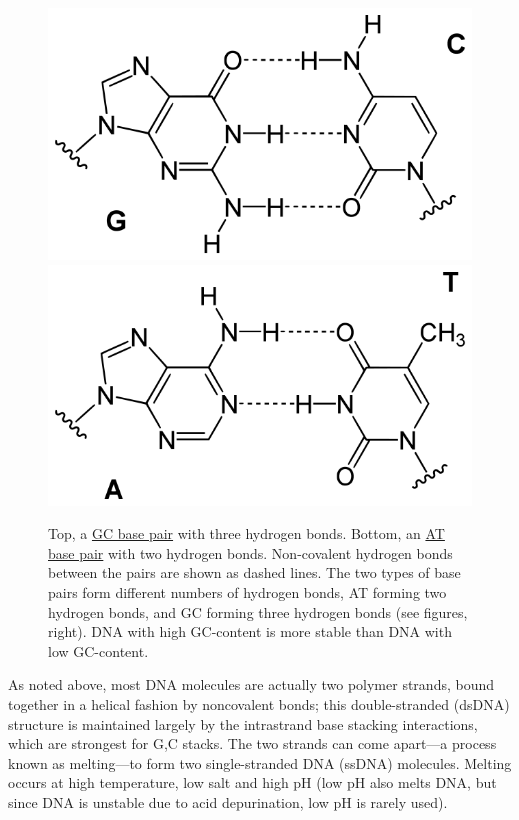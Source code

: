 \begin{figure}

{\centering \includegraphics[width=0.7\linewidth]{./figures/dna/Base_pair_GC} \includegraphics[width=0.7\linewidth]{./figures/dna/Base_pair_AT} 

}

\caption{Top, a \href{https://commons.wikimedia.org/wiki/File:Base_pair_GC.svg}{GC base pair} with three hydrogen bonds. Bottom, an \href{https://commons.wikimedia.org/wiki/File:Base_pair_AT.svg}{AT base pair} with two hydrogen bonds. Non-covalent hydrogen bonds between the pairs are shown as dashed lines. The two types of base pairs form different numbers of hydrogen bonds, AT forming two hydrogen bonds, and GC forming three hydrogen bonds (see figures, right). DNA with high GC-content is more stable than DNA with low GC-content.}\label{fig:pairing}
\end{figure}

As noted above, most DNA molecules are actually two polymer strands, bound together in a helical fashion by noncovalent bonds; this double-stranded (dsDNA) structure is maintained largely by the intrastrand base stacking interactions, which are strongest for G,C stacks. The two strands can come apart---a process known as melting---to form two single-stranded DNA (ssDNA) molecules. Melting occurs at high temperature, low salt and high pH (low pH also melts DNA, but since DNA is unstable due to acid depurination, low pH is rarely used).

